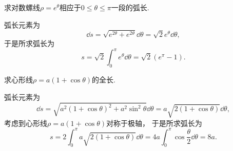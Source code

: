 \begin{example}
求对数螺线\(\rho=e^{\theta}\)相应于\(0\leq\theta\leq\pi\)一段的弧长.
\begin{solution}
弧长元素为\[
	\dd{s} = \sqrt{e^{2\theta}+e^{2\theta}} \dd{\theta}
	= \sqrt{2}e^{\theta} \dd{\theta},
\]
于是所求弧长为\[
	s = \sqrt{2} \int_0^\pi e^{\theta} \dd{\theta}
	= \sqrt{2} (e^\pi-1).
\]
\end{solution}
\end{example}

\begin{example}
求心形线\(\rho=a(1+\cos\theta)\)的全长.
\begin{solution}
弧长元素为\[
	\dd{s} = \sqrt{a^2(1+\cos\theta)^2+a^2\sin^2\theta} \dd{\theta}
	= a \sqrt{2(1+\cos\theta)} \dd{\theta},
\]
考虑到心形线\(\rho=a(1+\cos\theta)\)对称于极轴，
于是所求弧长为\[
	s = 2 \int_0^\pi a \sqrt{2(1+\cos\theta)} \dd{\theta}
	= 4a \int_0^\pi \cos\frac\theta2 \dd{\theta}
	= 8a.
\]
\end{solution}
\end{example}
